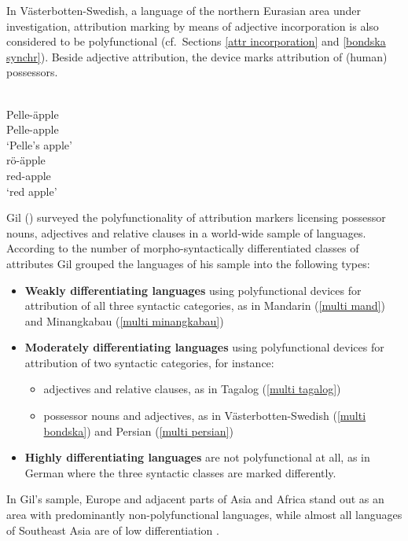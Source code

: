 In Västerbotten-Swedish, a language of the northern Eurasian area under investigation, attribution marking by means of adjective incorporation is also considered to be polyfunctional (cf.~Sections \ref{attr incorporation} and \ref{bondska synchr}). Beside adjective attribution, the device marks attribution of (human) possessors.
\begin{exe}
\ex 
{} \label{multi bondska}
\begin{xlist}
\\
\gll	Pelle-äpple\\
	Pelle-apple\\
\glt	‘Pelle's apple’
\\
\gll	rö-äpple\\
	red-apple\\
\glt	‘red apple’
\end{xlist}
\end{exe}
Gil (\citeyear{gil2005}) surveyed the polyfunctionality of attribution markers licensing possessor nouns, adjectives and relative clauses in a world-wide sample of languages. According to the number of morpho-syntactically differentiated classes of attributes Gil grouped the languages of his sample into the following types:
\begin{itemize}
\item \textbf{Weakly differentiating languages} using polyfunctional devices for attribution of all three syntactic categories, as in Mandarin (\ref{multi mand}) and Minangkabau (\ref{multi minangkabau})
\item \textbf{Moderately differentiating languages} using polyfunctional devices for attribution of two syntactic categories, for instance:
	\begin{itemize}
	\item adjectives and relative clauses, as in Tagalog (\ref{multi tagalog})
	\item possessor nouns and adjectives, as in Västerbotten-Swedish (\ref{multi bondska}) and Persian (\ref{multi persian})
	\end{itemize}
\item \textbf{Highly differentiating languages} are not polyfunctional at all, as in German where the three syntactic classes are marked differently.
\end{itemize}
In Gil's sample, Europe and adjacent parts of Asia and Africa stand out as an area with predominantly non-polyfunctional languages, while almost all languages of Southeast Asia are of low differentiation \citep[8]{gil2005}.

